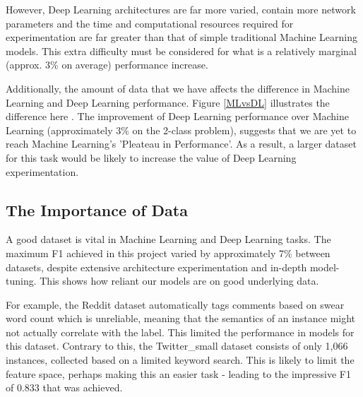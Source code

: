 \documentclass[12pt,a4paper]{article}
\begin{document}
However, Deep Learning architectures are far more varied, contain more network parameters and the time and computational resources required for experimentation are far greater than that of simple traditional Machine Learning models. This extra difficulty must be considered for what is a relatively marginal (approx. 3\% on average) performance increase.

Additionally, the amount of data that we have affects the difference in Machine Learning and Deep Learning performance. Figure \ref{MLvsDL} illustrates the difference here \cite{BuildDeeper}. The improvement of Deep Learning performance over Machine Learning (approximately 3\% on the 2-class problem), suggests that we are yet to reach Machine Learning's 'Pleateau in Performance'. As a result, a larger dataset for this task would be likely to increase the value of Deep Learning experimentation.


\subsection{The Importance of Data}

A good dataset is vital in Machine Learning and Deep Learning tasks. The maximum F1 achieved in this project varied by approximately 7\% between datasets, despite extensive architecture experimentation and in-depth model-tuning. This shows how reliant our models are on good underlying data. 

For example, the Reddit dataset automatically tags comments based on swear word count which is unreliable, meaning that the semantics of an instance might not actually correlate with the label. This limited the performance in models for this dataset. Contrary to this, the Twitter\_small dataset consists of only 1,066 instances, collected based on a limited keyword search. This is likely to limit the feature space, perhaps making this an easier task - leading to the impressive F1 of 0.833 that was achieved.
\end{document}
